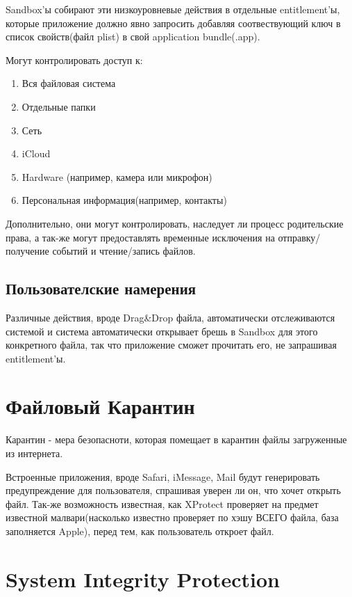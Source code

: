 \documentclass[12pt, a4paper]{article}
\begin{document}
Sandbox'ы собирают эти низкоуровневые действия в отдельные entitlement'ы, которые приложение должно явно запросить добавляя соотвествующий ключ в список свойств(файл plist) в свой application bundle(.app).

Могут контролировать доступ к:

\begin{enumerate}
  \item{Вся файловая система}
  \item{Отдельные папки}
  \item{Сеть}
  \item{iCloud}
  \item{Hardware (например, камера или микрофон)}
  \item{Персональная информация(например, контакты)}
\end{enumerate}

Дополнительно, они могут контролировать, наследует ли процесс родительские права, а так-же могут предоставлять временные исключения на отправку/получение событий и чтение/запись файлов.

\subsection{Пользователские намерения}

Различные действия, вроде Drag&Drop файла, автоматически отслеживаются системой и система автоматически открывает брешь в Sandbox для этого конкретного файла, так что приложение сможет прочитать его, не запрашивая entitlement'ы.

\section{Файловый Карантин}

Карантин - мера безопасноти, которая помещает в карантин файлы загруженные из интернета.

Встроенные приложения, вроде Safari, iMessage, Mail будут генерировать предупреждение для пользователя, спрашивая уверен ли он, что хочет открыть файл. Так-же возможность известная, как XProtect проверяет на предмет известной малвари(насколько известно проверяет по хэшу ВСЕГО файла, база заполняется Apple), перед тем, как пользователь откроет файл.

\section{System Integrity Protection}
\end{document}
